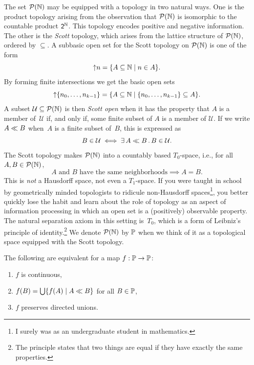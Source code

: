 The set $\mathcal{P}(\mathbb{N})$ may be equipped with a topology in two natural
ways. One is the product topology arising from the observation that
$\mathcal{P}(\mathbb{N})$ is isomorphic to the countable product $\mathsf{2}^{\mathbb{N}}$. This
topology encodes positive and negative information. The other is the
\emph{Scott} topology, which arises from the lattice structure of
$\mathcal{P}(\mathbb{N})$, ordered by $\subseteq$. A subbasic open set for the Scott
topology on $\mathcal{P}(\mathbb{N})$ is one of the form
%
\begin{equation*}
  {\uparrow}n = \{A \subseteq \mathbb{N} \mid n \in A\}.
\end{equation*}
%
By forming finite intersections we get the basic open sets
%
\begin{equation*}
  {\uparrow}\{n_0, \ldots, n_{k-1}\} =
  \{A \subseteq \mathbb{N} \mid \{n_0, \ldots, n_{k-1}\} \subseteq A\}.
\end{equation*}
%
A subset $\mathcal{U} \subseteq \mathcal{P}(\mathbb{N})$ is then \emph{Scott open}
when it has the property that $A$ is a member of~$\mathcal{U}$ if, and
only if, some finite subset of $A$ is a member of $\mathcal{U}$. If we
write $A \ll B$ when~$A$ is a finite subset of~$B$, this is
expressed as
%
\begin{equation*}
  B \in \mathcal{U} \iff \exists\, A \ll B\,.\,B \in \mathcal{U}.
\end{equation*}
%
The Scott topology makes $\mathcal{P}(\mathbb{N})$ into a countably based
$T_0$-space, i.e., for all $A, B \in \mathcal{P}(\mathbb{N})$,
%
\begin{equation*}
  \text{$A$ and $B$ have the same neighborhoods} \implies A = B.
\end{equation*}
%
This is \emph{not} a Hausdorff space, not even a $T_1$-space. If you
were taught in school by geometrically minded topologists to ridicule
non-Hausdorff spaces\footnote{I surely was as an undergraduate student
  in mathematics.}, you better quickly lose the habit and learn about
the role of topology as an aspect of information processing in which
an open set is a (positively) observable property. The natural
separation axiom in this setting is~$T_0$, which is a form of
Leibniz's principle of identity.\footnote{The principle states that
  two things are equal if they have exactly the same properties.} We
denote $\mathcal{P}(\mathbb{N})$ by $\mathbb{P}$ when we think of it as a topological
space equipped with the Scott topology.

\begin{proposition}
  The following are equivalent for a map $f : \mathbb{P} \to \mathbb{P}$:
  \begin{enumerate}
  \item $f$ is continuous,
  \item $f(B) = \bigcup\nolimits \{f(A) \mid A \ll B\}$ for all $B \in \mathbb{P}$,
  \item $f$ preserves directed unions.
  \end{enumerate}
\end{proposition}

